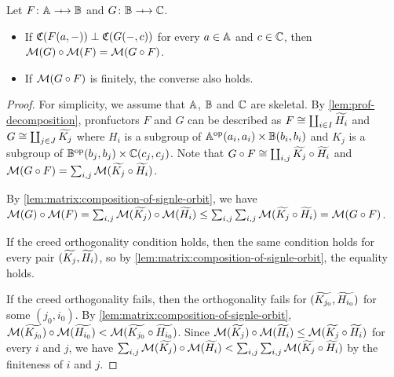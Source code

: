 \begin{theorem}
    Let \( F \colon \Grp \profarrow \Grpb \) and \( G \colon \Grpb \profarrow \Grpc \).
    \begin{itemize}
        \item If \( \mathfrak{C}(F(a, {-})) \mathrel{\bot} \mathfrak{C}(G({-}, c)) \) for every \( a \in \mathbb{A} \) and \( c \in \mathbb{C} \), then \( \mathcal{M}({G}) \circ \mathcal{M}({F}) = \mathcal{M}({G \circ F}) \).
        \item If \( \mathcal{M}({G \circ F}) \) is finitely, the converse also holds. 
    \end{itemize}
\end{theorem}
\begin{proof}
    For simplicity, we assume that \( \mathbb{A} \), \( \mathbb{B} \) and \( \mathbb{C} \) are skeletal.
    By \cref{lem:prof-decomposition}, pronfuctors \( F \) and \( G \) can be described as \( F \cong \coprod_{i \in I} \widetilde{H_i} \) and \( G \cong \coprod_{j \in J} \widetilde{K_j} \) where \( H_i \) is a subgroup of \( \mathbb{A}^{\mathrm{op}}(a_i, a_i) \times \mathbb{B}(b_i, b_i) \) and \( K_j \) is a subgroup of \( \mathbb{B}^{\mathrm{op}}(b_j, b_j) \times \mathbb{C}(c_j, c_j) \).
    Note that \( G \circ F \cong \coprod_{i,j} \widetilde{K_j} \circ \widetilde{H_i} \) and \( \mathcal{M}({G \circ F}) = \sum_{i,j} \mathcal{M}({\widetilde{K_j} \circ \widetilde{H_i}}) \).

    By \cref{lem:matrix:composition-of-signle-orbit}, we have \( \mathcal{M}({G}) \circ \mathcal{M}({F}) = \sum_{i,j} \mathcal{M}({\widetilde{K_j}}) \circ \mathcal{M}({\widetilde{H_i}}) \le \sum_{i,j} \sum_{i,j} \mathcal{M}({\widetilde{K_j} \circ \widetilde{H_i}}) = \mathcal{M}({G \circ F}) \).

    If the creed orthogonality condition holds, then the same condition holds for every pair \( (\widetilde{K_j}, \widetilde{H_i}) \), so by \cref{lem:matrix:composition-of-signle-orbit}, the equality holds.

    If the creed orthogonality fails, then the orthogonality fails for \( (\widetilde{K_{j_0}}, \widetilde{H_{i_0}}) \) for some \( (j_0,i_0) \).
    By \cref{lem:matrix:composition-of-signle-orbit}, \( \mathcal{M}({\widetilde{K_{j_0}}}) \circ \mathcal{M}({\widetilde{H_{i_0}}}) < \mathcal{M}({\widetilde{K_{j_0}} \circ \widetilde{H_{i_0}}}) \).
    Since \( \mathcal{M}({\widetilde{K_{j}}}) \circ \mathcal{M}({\widetilde{H_{i}}}) \le \mathcal{M}({\widetilde{K_{j}} \circ \widetilde{H_{i}}}) \) for every \( i \) and \( j \), we have \( \sum_{i,j} \mathcal{M}({\widetilde{K_j}}) \circ \mathcal{M}({\widetilde{H_i}}) < \sum_{i,j} \sum_{i,j} \mathcal{M}({\widetilde{K_j} \circ \widetilde{H_i}}) \) by the finiteness of \( i \) and \( j \).
\end{proof}

